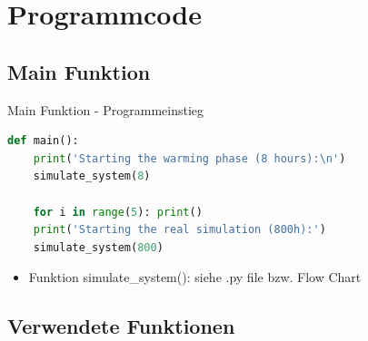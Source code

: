 \section{Programmcode}
\subsection{Main Funktion}
\begin{frame}[fragile]{Main Funktion - Programmeinstieg}
  \begin{lstlisting}[language=python]
def main():
    print('Starting the warming phase (8 hours):\n')
    simulate_system(8) 
    
    for i in range(5): print()
    print('Starting the real simulation (800h):')
    simulate_system(800)
\end{lstlisting}
\logopythonbottom

  \begin{itemize}
  	\item Funktion simulate\_system(): siehe .py file bzw. Flow Chart
  \end{itemize}
\end{frame}

\subsection{Verwendete Funktionen}
%
%



